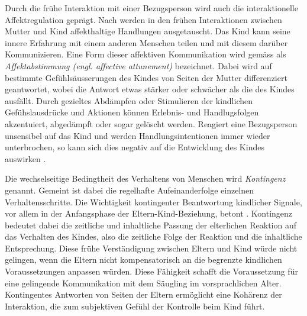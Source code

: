 Durch die frühe Interaktion mit einer Bezugsperson wird auch die interaktionelle Affektregulation geprägt. Nach  werden in den frühen Interaktionen zwischen Mutter und Kind affekthaltige Handlungen ausgetauscht. Das Kind kann seine innere Erfahrung mit einem anderen Menschen teilen und mit diesem darüber Kommunizieren. Eine Form dieser affektiven Kommunikation wird gemäss  als \textit{Affektabstimmung (engl. affective attunement)} bezeichnet. Dabei wird auf bestimmte Gefühlsäusserungen des Kindes von Seiten der Mutter differenziert geantwortet, wobei die Antwort etwas stärker oder schwächer als die des Kindes ausfällt. Durch gezieltes Abdämpfen oder Stimulieren der kindlichen Gefühslausdrücke und Aktionen können Erlebnis- und Handlugsfolgen akzentuiert, abgedämpft oder sogar gelöscht werden. Reagiert eine Bezugsperson unsensibel auf das Kind und werden Handlungsintentionen immer wieder unterbrochen, so kann sich dies negativ auf die Entwicklung des Kindes auswirken \cite{Resch1999}.

Die wechselseitige Bedingtheit des Verhaltens von Menschen wird \textit{Kontingenz} genannt. Gemeint ist dabei die regelhafte Aufeinanderfolge einzelnen Verhaltensschritte. Die Wichtigkeit kontingenter Beantwortung kindlicher Signale, vor allem in der Anfangsphase der Eltern-Kind-Beziehung, betont . Kontingenz bedeutet dabei die zeitliche und inhaltliche Passung der elterlichen Reaktion auf das Verhalten des Kindes, also die zeitliche Folge der Reaktion und die inhaltliche Entsprechung. Diese frühe Verständigung zwischen Eltern und Kind würde nicht gelingen, wenn die Eltern nicht kompensatorisch an die begrenzte kindlichen Voraussetzungen anpassen würden. Diese Fähigkeit schafft die Voraussetzung für eine gelingende Kommunikation mit dem Säugling im vorsprachlichen Alter. Kontingentes Antworten von Seiten der Eltern ermöglicht eine Kohärenz der Interaktion, die zum subjektiven Gefühl der Kontrolle beim Kind führt.

